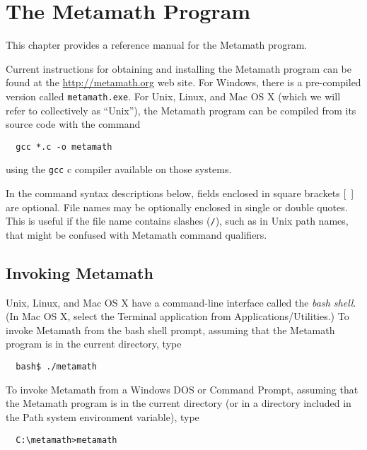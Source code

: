 \chapter{The Metamath Program}\label{commands}

This chapter provides a reference manual for the
Metamath program.

Current instructions for obtaining and installing the Metamath program
can be found at the \url{http://metamath.org} web site.
For Windows, there is a pre-compiled version called
\texttt{metamath.exe}.  For Unix, Linux, and Mac OS X
(which we will refer to collectively as ``Unix''), the Metamath program
can be compiled from its source code with the command
\begin{verbatim}
  gcc *.c -o metamath
\end{verbatim}
using the \texttt{gcc} {\sc c} compiler available on those systems.

In the command syntax descriptions below, fields enclosed in square
brackets [\ ] are optional.  File names may be optionally enclosed in
single or double quotes.  This is useful if the file name contains
slashes (\texttt{/}), such as in Unix path names,  that might be confused with Metamath
command qualifiers.

\section{Invoking Metamath}

Unix, Linux, and Mac OS X
have a command-line interface called the {\em
bash shell}.  (In Mac OS X, select the Terminal application from
Applications/Utilities.)  To invoke Metamath from the bash shell prompt,
assuming that the Metamath program is in the current directory, type
\begin{verbatim}
  bash$ ./metamath
\end{verbatim}

To invoke Metamath from a Windows DOS or Command Prompt, assuming that
the Metamath program is in the current directory (or in a directory
included in the Path system environment variable), type
\begin{verbatim}
  C:\metamath>metamath
\end{verbatim}

